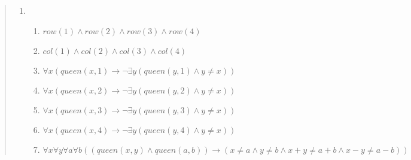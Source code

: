 \documentclass{article}
\theoremstyle{definition}
\newcommand{\<}{\langle}
\renewcommand{\>}{\rangle}
\begin{document}
\begin{enumerate}[label=\textbf{\arabic*.}]
\begin{quote}
\begin{enumerate}
  \item 
      \begin{enumerate}
        \item $row(1) \land row(2) \land row(3) \land row(4)$
        \item $col(1) \land col(2) \land col(3) \land col(4)$
        \item $\forall x(queen(x,1) \to \lnot \exists y(queen(y,1) \land y \neq x))$
        \item $\forall x(queen(x,2) \to \lnot \exists y(queen(y,2) \land y \neq x))$
        \item $\forall x(queen(x,3) \to \lnot \exists y(queen(y,3) \land y \neq x))$
        \item $\forall x(queen(x,4) \to \lnot \exists y(queen(y,4) \land y \neq x))$
        \item $\forall x\forall y\forall a\forall b((queen(x,y) \land queen(a,b)) \to (x \neq a \land y \neq b \land x+y \neq a+b \land x-y \neq a-b))$      
      \end{enumerate}
      \vspace{0.5em}
\end{enumerate}

\end{quote}

\end{enumerate}
\end{document}
